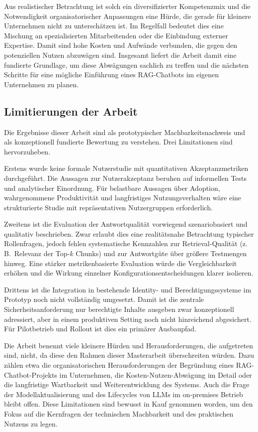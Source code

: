 Aus realistischer Betrachtung ist solch ein diversifizierter Kompetenzmix und die Notwendigkeit organisatorischer Anpassungen eine Hürde, die gerade für kleinere Unternehmen nicht zu unterschätzen ist.
Im Regelfall bedeutet dies eine Mischung an spezialisierten Mitarbeitenden oder die Einbindung externer Expertise.
Damit sind hohe Kosten und Aufwände verbunden, die gegen den potenziellen Nutzen abzuwägen sind.
Insgesamt liefert die Arbeit damit eine fundierte Grundlage, um diese Abwägungen sachlich zu treffen und die nächsten Schritte für eine mögliche Einführung eines RAG-Chatbots im eigenen Unternehmen zu planen.

\subsection{Limitierungen der Arbeit}\label{subsec:limitierungen-der-arbeit}

Die Ergebnisse dieser Arbeit sind als prototypischer Machbarkeitsnachweis und als konzeptionell fundierte Bewertung zu verstehen.
Drei Limitationen sind hervorzuheben.

Erstens wurde keine formale Nutzerstudie mit quantitativen Akzeptanzmetriken durchgeführt.
Die Aussagen zur Nutzerakzeptanz beruhen auf informellen Tests und analytischer Einordnung.
Für belastbare Aussagen über Adoption, wahrgenommene Produktivität und langfristiges Nutzungsverhalten wäre eine strukturierte Studie mit repräsentativen Nutzergruppen erforderlich.

Zweitens ist die Evaluation der Antwortqualität vorwiegend szenariobasiert und qualitativ beschrieben.
Zwar erlaubt dies eine realitätsnahe Betrachtung typischer Rollenfragen, jedoch fehlen systematische Kennzahlen zur Retrieval-Qualität (z.\,B.\ Relevanz der Top-$k$ Chunks) und zur Antwortgüte über größere Testmengen hinweg.
Eine stärker metrikenbasierte Evaluation würde die Vergleichbarkeit erhöhen und die Wirkung einzelner Konfigurationsentscheidungen klarer isolieren.

Drittens ist die Integration in bestehende Identity- und Berechtigungssysteme im Prototyp noch nicht vollständig umgesetzt.
Damit ist die zentrale Sicherheitsanforderung \glqq nur berechtigte Inhalte ausgeben\grqq{} zwar konzeptionell adressiert, aber in einem produktiven Setting noch nicht hinreichend abgesichert.
Für Pilotbetrieb und Rollout ist dies ein primärer Ausbaupfad.

Die Arbeit benennt viele kleinere Hürden und Herausforderungen, die aufgetreten sind, nicht, da diese den Rahmen dieser Masterarbeit überschreiten würden.
Dazu zählen etwa die organisatorischen Herausforderungen der Begründung eines RAG-Chatbot-Projekts im Unternehmen, die Kosten-Nutzen-Abwägung im Detail oder die langfristige Wartbarkeit und Weiterentwicklung des Systems.
Auch die Frage der Modellaktualisierung und des Lifecycles von LLMs im on-premises Betrieb bleibt offen.
Diese Limitationen sind bewusst in Kauf genommen worden, um den Fokus auf die Kernfragen der technischen Machbarkeit und des praktischen Nutzens zu legen.


